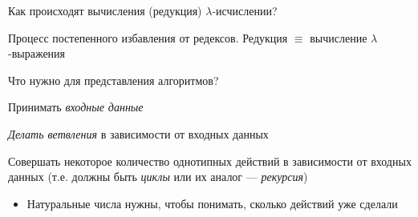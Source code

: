 \begin{frame}{Как происходят вычисления (редукция) $\lambda$-исчислении?}
\vspace{-0.5em}
\begin{definition}[Редукция]
Процесс постепенного избавления от редексов. Редукция $\equiv$ вычисление $\lambda$-выражения
\end{definition}

\end{frame}

\begin{frame}{Что нужно для представления алгоритмов?}

     Принимать \emph{входные данные}\vspace{1em}

    \emph{Делать ветвления}  в зависимости от входных данных\vspace{1em}

    Совершать некоторое количество однотипных действий в зависимости от входных данных (т.е. должны быть \emph{циклы} или их аналог --- \emph{рекурсия})
    \begin{itemize}
\item  Натуральные числа нужны, чтобы понимать, сколько действий уже сделали
    \end{itemize}
\end{frame}

